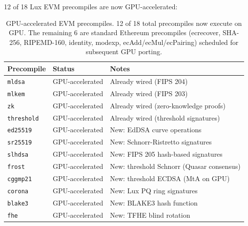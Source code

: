 12 of 18 Lux EVM precompiles are now GPU-accelerated:

\begin{table}[h]
\centering
\small
\begin{tabular}{lll}
\toprule
\textbf{Precompile} & \textbf{Status} & \textbf{Notes} \\
\midrule
\texttt{mldsa}     & GPU-accelerated & Already wired (FIPS 204) \\
\texttt{mlkem}     & GPU-accelerated & Already wired (FIPS 203) \\
\texttt{zk}        & GPU-accelerated & Already wired (zero-knowledge proofs) \\
\texttt{threshold} & GPU-accelerated & Already wired (threshold signatures) \\
\texttt{ed25519}   & GPU-accelerated & New: EdDSA curve operations \\
\texttt{sr25519}   & GPU-accelerated & New: Schnorr-Ristretto signatures \\
\texttt{slhdsa}    & GPU-accelerated & New: FIPS 205 hash-based signatures \\
\texttt{frost}     & GPU-accelerated & New: threshold Schnorr (Quasar consensus) \\
\texttt{cggmp21}   & GPU-accelerated & New: threshold ECDSA (MtA on GPU) \\
\texttt{corona}  & GPU-accelerated & New: Lux PQ ring signatures \\
\texttt{blake3}    & GPU-accelerated & New: BLAKE3 hash function \\
\texttt{fhe}       & GPU-accelerated & New: TFHE blind rotation \\
\bottomrule
\end{tabular}
\caption{GPU-accelerated EVM precompiles. 12 of 18 total precompiles now execute on GPU.
The remaining 6 are standard Ethereum precompiles (ecrecover, SHA-256, RIPEMD-160,
identity, modexp, ecAdd/ecMul/ecPairing) scheduled for subsequent GPU porting.}
\label{tab:precompiles}
\end{table}

